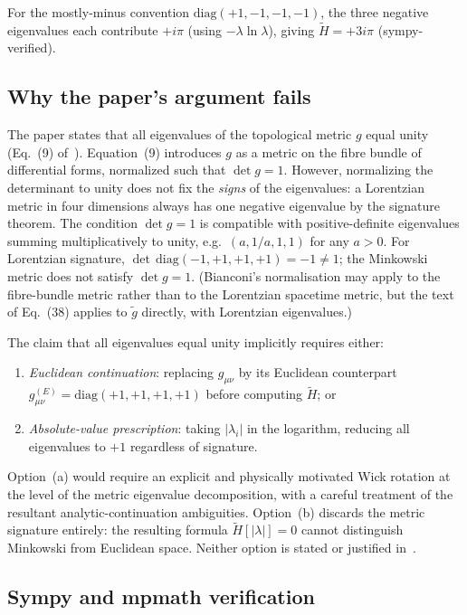 \documentclass[aps,prd,twocolumn,preprintnumbers,superscriptaddress]{revtex4-2}
\newcommand{\tg}{\tilde{g}}
\newcommand{\iunit}{i}
\begin{document}
For the mostly-minus convention $\mathrm{diag}(+1,-1,-1,-1)$, the three
negative eigenvalues each contribute $+\iunit\pi$ (using $-\lambda\ln\lambda$),
giving $\tilde{H} = +3\iunit\pi$ (sympy-verified).

\subsection{Why the paper's argument fails}

The paper states that all eigenvalues of the topological metric $g$ equal
unity (Eq.~(9) of~\cite{Bianconi2025}).  Equation~(9) introduces $g$ as a
metric on the fibre bundle of differential forms, normalized such that
$\det g = 1$.  However, normalizing the determinant to unity does not
fix the \emph{signs} of the eigenvalues: a Lorentzian metric in four
dimensions always has one negative eigenvalue by the signature theorem.
The condition $\det g = 1$ is compatible with positive-definite eigenvalues
summing multiplicatively to unity, e.g.\ $(a, 1/a, 1, 1)$ for any $a>0$.
For Lorentzian signature, $\det\,\mathrm{diag}(-1,+1,+1,+1)=-1\neq 1$;
the Minkowski metric does not satisfy $\det g = 1$.
(Bianconi's normalisation may apply to the fibre-bundle metric rather
than to the Lorentzian spacetime metric, but the text of Eq.~(38)
applies to $\tg$ directly, with Lorentzian eigenvalues.)

The claim that all eigenvalues equal unity implicitly requires either:
\begin{enumerate}
  \item[(a)] \emph{Euclidean continuation}: replacing $g_{\mu\nu}$ by
    its Euclidean counterpart $g^{(E)}_{\mu\nu} = \mathrm{diag}(+1,+1,+1,+1)$
    before computing $\tilde{H}$; or
  \item[(b)] \emph{Absolute-value prescription}: taking
    $|\lambda_i|$ in the logarithm, reducing all eigenvalues to $+1$
    regardless of signature.
\end{enumerate}
Option~(a) would require an explicit and physically motivated Wick rotation
at the level of the metric eigenvalue decomposition, with a careful
treatment of the resultant analytic-continuation ambiguities.
Option~(b) discards the metric signature entirely: the resulting formula
$\tilde{H}[|\lambda|] = 0$ cannot distinguish Minkowski from Euclidean
space.
Neither option is stated or justified in~\cite{Bianconi2025}.

\subsection{Sympy and mpmath verification}
\end{document}
